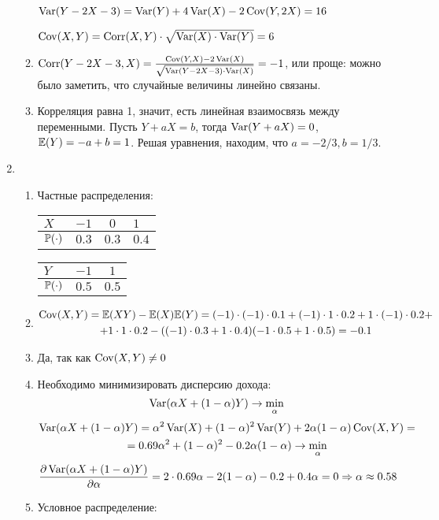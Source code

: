 \begin{enumerate}
\begin{enumerate}
$\Var(Y - 2X - 3) = \Var(Y) + 4\Var(X) - 2\Cov(Y, 2X) = 16$

$\Cov(X, Y) = \Corr(X,Y) \cdot \sqrt{\Var(X) \cdot \Var(Y)} = 6$
\item $\Corr(Y - 2X - 3, X) = \frac{\Cov(Y, X) - 2 \Var(X)}{\sqrt{\Var(Y - 2X - 3) \cdot \Var(X)}} = -1$, или проще: можно было заметить, что случайные величины линейно связаны.
\item Корреляция равна 1, значит, есть линейная взаимосвязь между переменными. Пусть $Y+ a X = b$, тогда $\Var(Y+ a X)=0$, $\E(Y) = -a + b =1 $. Решая уравнения, находим, что $a=-2/3, b=1/3$.
\end{enumerate}
\item
\begin{enumerate}
\item Частные распределения:

\begin{tabular}{@{}lccl@{}}
\toprule
$X$         & $-1$  & $0$   & $1$   \\ \midrule
$\P(\cdot)$ & $0.3$ & $0.3$ & $0.4$ \\ \bottomrule
\end{tabular}
\hspace{1cm}
\begin{tabular}{@{}lcc@{}}
\toprule
$Y$         & $-1$  & $1$   \\ \midrule
$\P(\cdot)$ & $0.5$ & $0.5$ \\ \bottomrule
\end{tabular}
\item
\begin{multline*}
\Cov(X, Y) = \E(XY) - \E(X)\E(Y) = (-1) \cdot (-1) \cdot 0.1 + (-1) \cdot 1 \cdot 0.2 + 1 \cdot (-1 ) \cdot 0.2 + \\
 + 1 \cdot 1 \cdot 0.2 - ((-1) \cdot 0.3 + 1 \cdot 0.4) (-1\cdot 0.5 + 1 \cdot 0.5) = -0.1
\end{multline*}
\item Да, так как $\Cov(X, Y) \neq 0$
\item Необходимо минимизировать дисперсию дохода:
\[\Var(\alpha X + (1- \alpha)Y) \to \min_{\alpha} \]
\begin{multline*}
\Var(\alpha X + (1- \alpha)Y)  = \alpha^2 \Var(X) + (1-\alpha)^2 \Var(Y) + 2 \alpha(1-\alpha)\Cov(X, Y) = \\
= 0.69 \alpha^2  + (1-\alpha)^2 -0.2 \alpha(1-\alpha) \to \min_{\alpha}
\end{multline*}
\[
\frac{\partial \Var(\alpha X + (1- \alpha)Y)}{\partial \alpha} = 2 \cdot 0.69 \alpha - 2(1-\alpha) -0.2 + 0.4 \alpha = 0 \Rightarrow
\alpha \approx 0.58
\]
\item Условное распределение:


\end{enumerate}
\end{enumerate}
